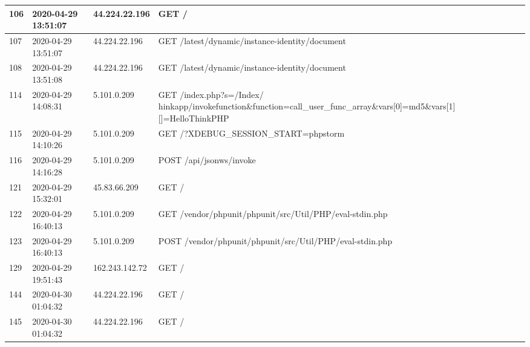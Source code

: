 \documentclass[12pt]{article}
\begin{document}
\begin{longtable}{|l|l|l|l|}
106 & 2020-04-29 13:51:07 & 44.224.22.196   & GET /                                                                                                                               \\ \hline
107 & 2020-04-29 13:51:07 & 44.224.22.196   & GET /latest/dynamic/instance-identity/document                                                                                      \\ \hline
108 & 2020-04-29 13:51:08 & 44.224.22.196   & GET /latest/dynamic/instance-identity/document                                                                                      \\ \hline
114 & 2020-04-29 14:08:31 & 5.101.0.209     & GET /index.php?s=/Index/	hinkapp/invokefunction\&function=call\_user\_func\_array\&vars{[}0{]}=md5\&vars{[}1{]}{[}{]}=HelloThinkPHP \\ \hline
115 & 2020-04-29 14:10:26 & 5.101.0.209     & GET /?XDEBUG\_SESSION\_START=phpstorm                                                                                               \\ \hline
116 & 2020-04-29 14:16:28 & 5.101.0.209     & POST /api/jsonws/invoke                                                                                                             \\ \hline
121 & 2020-04-29 15:32:01 & 45.83.66.209    & GET /                                                                                                                               \\ \hline
122 & 2020-04-29 16:40:13 & 5.101.0.209     & GET /vendor/phpunit/phpunit/src/Util/PHP/eval-stdin.php                                                                             \\ \hline
123 & 2020-04-29 16:40:13 & 5.101.0.209     & POST /vendor/phpunit/phpunit/src/Util/PHP/eval-stdin.php                                                                            \\ \hline
129 & 2020-04-29 19:51:43 & 162.243.142.72  & GET /                                                                                                                               \\ \hline
144 & 2020-04-30 01:04:32 & 44.224.22.196   & GET /                                                                                                                               \\ \hline
145 & 2020-04-30 01:04:32 & 44.224.22.196   & GET /                                                                                                                               \\ \hline

\end{longtable}
\end{document}
